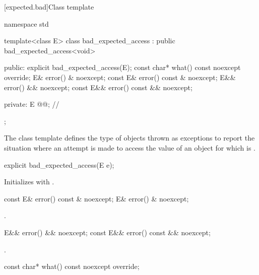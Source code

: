 [expected.bad]{Class template }

%
\begin{codeblock}
namespace std {
  template<class E>
  class bad_expected_access : public bad_expected_access<void> {
  public:
    explicit bad_expected_access(E);
    const char* what() const noexcept override;
    E& error() & noexcept;
    const E& error() const & noexcept;
    E&& error() && noexcept;
    const E&& error() const && noexcept;

  private:
    E @@;             // \expos
  };
}
\end{codeblock}

\pnum
The class template 
defines the type of objects thrown as exceptions to report the situation
where an attempt is made to access the value of an  object
for which  is .

%
\begin{itemdecl}
explicit bad_expected_access(E e);
\end{itemdecl}

\begin{itemdescr}
\pnum
\effects
Initializes  with .
\end{itemdescr}

%
\begin{itemdecl}
const E& error() const & noexcept;
E& error() & noexcept;
\end{itemdecl}

\begin{itemdescr}
\pnum
\returns
{}.
\end{itemdescr}

%
\begin{itemdecl}
E&& error() && noexcept;
const E&& error() const && noexcept;
\end{itemdecl}

\begin{itemdescr}
\pnum
\returns
{}.
\end{itemdescr}

%
\begin{itemdecl}
const char* what() const noexcept override;
\end{itemdecl}

